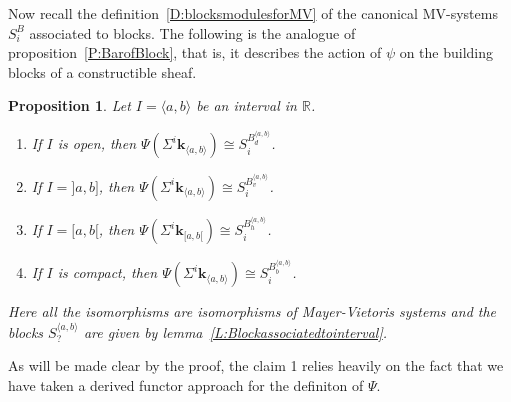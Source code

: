 \documentclass[a4paper, english, 11pt]{article}
\newcommand{\kk}[0]{\textbf{k}}
\newcommand{\0}{\vec{0}}
\newcommand{\R}[0]{\mathbb{R}}
\newtheorem{prop}{Proposition}[section]
\newtheorem{remark}[prop]{Remark}
\begin{document}
Now recall the definition~\ref{D:blocksmodulesforMV} of the canonical MV-systems $S_i^B$ associated to blocks. The following is the analogue of proposition~\ref{P:BarofBlock}, that is, it describes the action of $\psi$ on the building blocks of a constructible sheaf.
\begin{prop}\label{P:PsionIntervals}  Let $I=\langle a, b\rangle$ be an interval in $\R$. 
\begin{enumerate}
    \item If $I$ is open, then  $\Psi ({\Sigma^i \kk_{\langle a, b\rangle}}) \cong 
S_i^{B_{d}^{\langle a, b\rangle}}$.
    \item If $I=]a,b]$, then  $\Psi ({\Sigma^i \kk_{\langle a, b\rangle}}) \cong 
S_i^{B_{v}^{\langle a, b\rangle}}$.
    \item If $I=[a, b[$, then  $\Psi ({\Sigma^i \kk_{[ a, b[}}) \cong 
S_i^{B_{h}^{\langle a, b\rangle}}$. 
    \item If $I$ is compact, then  $\Psi ({\Sigma^i \kk_{\langle a, b\rangle}}) \cong 
S_i^{B_{b}^{\langle a, b\rangle}}$. 
\end{enumerate}
Here all the isomorphisms are isomorphisms of Mayer-Vietoris systems and the blocks $S_{?}^{\langle a, b\rangle}$ are given by lemma~\ref{L:Blockassociatedtointerval}.
\end{prop}
As will be made clear by the proof, the claim 1  relies heavily on the fact that we have taken a derived functor approach for the definiton of $\Psi$. 
\end{document}
